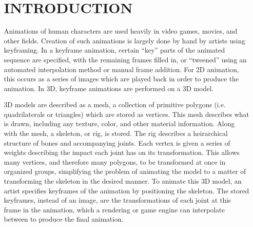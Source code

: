 
 
\chapter{INTRODUCTION}
\label{chapter:intro}


Animations of human characters are used heavily in video games, movies, and other fields.  Creation of such animations is largely done by hand by artists using keyframing.  In a keyframe animation, certain ``key'' parts of the animated sequence are specified, with the remaining frames filled in, or ``tweened'' using an automated interpolation method or manual frame addition.  For 2D animation, this occurs as a series of images which are played back in order to produce the animation.  In 3D, keyframe animations are performed on a 3D model.


3D models are described as a mesh, a collection of primitive polygons (i.e. quadrilaterals or triangles) which are stored as vertices.  This mesh describes what is drawn, including any texture, color, and other material information.  Along with the mesh, a skeleton, or rig, is stored.  The rig describes a heirarchical structure of bones and accompanying joints.  Each vertex is given a series of weights describing the impact each joint has on its transformation.  This allows many vertices, and therefore many polygons, to be transformed at once in organized groups, simplifying the problem of animating the model to a matter of transforming the skeleton in the desired manner.  To animate this 3D model, an artist specifies keyframes of the animation by positioning the skeleton.  The stored keyframes, instead of an image, are the transformations of each joint at this frame in the animation, which a rendering or game engine can interpolate between to produce the final animation.

